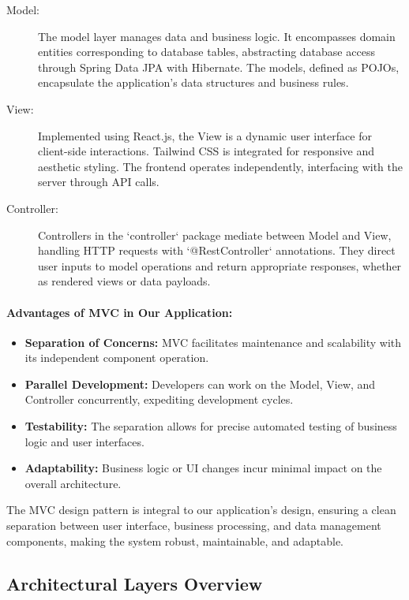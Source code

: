 \begin{description}
  \item[Model:] The model layer manages data and business logic. It encompasses domain entities corresponding to database tables, abstracting database access through Spring Data JPA with Hibernate. The models, defined as POJOs, encapsulate the application's data structures and business rules.
  
  \item[View:] Implemented using React.js, the View is a dynamic user interface for client-side interactions. Tailwind CSS is integrated for responsive and aesthetic styling. The frontend operates independently, interfacing with the server through API calls.
  
  \item[Controller:] Controllers in the `controller` package mediate between Model and View, handling HTTP requests with `@RestController` annotations. They direct user inputs to model operations and return appropriate responses, whether as rendered views or data payloads.
\end{description}
\cite{sandeshMVC2018}

\paragraph{Advantages of MVC in Our Application:}
\begin{itemize}
  \item \textbf{Separation of Concerns:} MVC facilitates maintenance and scalability with its independent component operation.
  \item \textbf{Parallel Development:} Developers can work on the Model, View, and Controller concurrently, expediting development cycles.
  \item \textbf{Testability:} The separation allows for precise automated testing of business logic and user interfaces.
  \item \textbf{Adaptability:} Business logic or UI changes incur minimal impact on the overall architecture.
\end{itemize}

The MVC design pattern is integral to our application's design, ensuring a clean separation between user interface, business processing, and data management components, making the system robust, maintainable, and adaptable. \cite{Tutorialspoint2020}


\subsection{Architectural Layers Overview}

